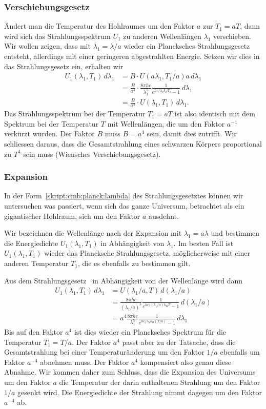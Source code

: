 \subsubsection{Verschiebungsgesetz}
Ändert man die Temperatur des Hohlraumes um den Faktor $a$ zur $T_1=aT$,
dann wird sich das Strahlungsspektrum $U_1$ zu anderen Wellenlängen
$\lambda_1$ verschieben.
Wir wollen zeigen, dass mit $\lambda_1=\lambda/a$ wieder ein Plancksches
Strahlungsgesetz entsteht, allerdings mit einer geringeren abgestrahlten
Energie.
Setzen wir dies in das Strahlungsgesetz ein, erhalten wir
\begin{align*}
U_1(\lambda_1,T_1)\,d\lambda_1
&=
B\cdot
U(a\lambda_1,T_1/a)a\,d\lambda_1
\\
&=
\frac{B}{a^4}
\cdot
\frac{8\pi hc}{\lambda_1^5}\frac{1}{e^{hc/\lambda_1k_BT_1}-1}\,d\lambda_1
\\
&=
\frac{B}{a^4}\cdot U(\lambda_1,T_1)\,d\lambda_1.
\end{align*}
Das Strahlungsspektrum bei der Temperatur $T_1=aT$ ist also identisch mit dem
Spektrum bei der Temperatur $T$ mit Wellenlängen, die um den Faktor $a^{-1}$
verkürzt wurden.
Der Faktor $B$ muss $B=a^4$ sein, damit dies zutrifft.
Wir schliessen daraus, dass die Gesamtstrahlung eines schwarzen Körpers
proportional zu $T^4$ sein muss (Wiensches Verschiebungsgesetz).

\subsubsection{Expansion}
In der Form~\eqref{skript:cmb:planck:lambda}
des Strahlungsgesetztes können wir untersuchen was
passiert, wenn sich das ganze Universum, betrachtet als ein gigantischer
Hohlraum, sich um den Faktor $a$ ausdehnt.

Wir bezeichnen die Wellenlänge nach der Expansion mit $\lambda_1=a\lambda$
und bestimmen die Energiedichte $U_1(\lambda_1,T_1)$ in Abhängigkeit von
$\lambda_1$.
Im besten Fall ist $U_1(\lambda_1,T_1)$ wieder das Plancksche
Strahlungsgesetz, möglicherweise mit einer anderen Temperatur $T_1$, die
es ebenfalls zu bestimmen gilt.

Aus dem Strahlungsgesetz~\label{skript:cmb:planck:lambda} in Abhängigkeit
von der Wellenlänge wird dann
\begin{align*}
U_1(\lambda_1,T_1)\,d\lambda_1
&=
U(\lambda_1/a,T)\,d(\lambda_1/a)
\\
&=
\frac{8\pi hc}{(\lambda_1/a)^5}
\frac{1}{e^{hc/(\lambda_1/a) k_BT}-1}\,d(\lambda_1/a)
\\
&=
a^4
\frac{8\pi hc}{\lambda_1^5}
\frac{1}{e^{hc/\lambda_1 k_B(T/a)}-1}\,d\lambda_1
\end{align*}
Bis auf den Faktor $a^4$ ist dies wieder ein Plancksches Spektrum
für die Temperatur $T_1=T/a$.
Der Faktor $a^4$ passt aber zu der Tatsache, dass die Gesamtstrahlung
bei einer Temperaturänderung um den Faktor $1/a$ ebenfalls um Faktor
$a^{-4}$ abnehmen muss.
Der Faktor $a^4$ kompensiert also genau diese Abnahme.
Wir kommen daher zum Schluss, dass die Expansion des Universums um den
Faktor $a$ die Temperatur der darin enthaltenen Strahlung um den Faktor
$1/a$ gesenkt wird.
Die Energiedichte der Strahlung nimmt dagegen um den Faktor $a^{-4}$ ab.

